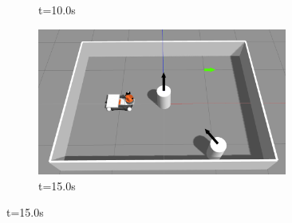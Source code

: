\documentclass{beamer}
\begin{document}
\begin{frame}
\begin{figure}[H]
\begin{subfigure}[b]{0.50\linewidth}
            \caption{t=10.0s}
        \end{subfigure}%
        \begin{subfigure}[b]{0.50\linewidth}
            \centering
            \includegraphics[width=0.90\textwidth]{../report/images/test_case_2/exp4.png}
            \caption{t=15.0s}
        \end{subfigure}%
    \end{figure}
\end{frame}
\end{document}
